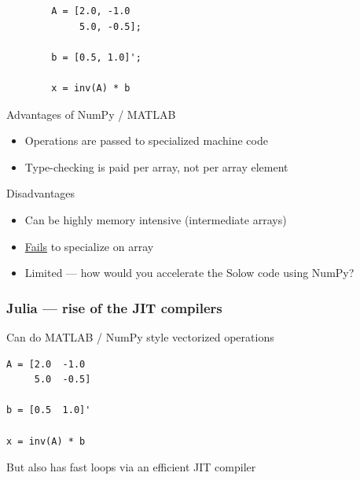 \begin{frame}[fragile]
    
    \begin{verbatim}
        A = [2.0, -1.0
             5.0, -0.5];

        b = [0.5, 1.0]';

        x = inv(A) * b
    \end{verbatim}
    
\end{frame}



    

\begin{frame}
    
    Advantages of NumPy / MATLAB

    \vspace{0.5em}
    \begin{itemize}
        \item Operations are passed to specialized machine code 
        \vspace{0.5em}
        \item Type-checking is paid per array, not per array element
    \end{itemize}

    \vspace{0.5em}
    \vspace{0.5em}
    Disadvantages 

    \begin{itemize}
        \item Can be highly memory intensive (intermediate arrays)
        \vspace{0.5em}
        \item \underline{Fails} to specialize on array 
        \vspace{0.5em}
        \item Limited --- how would you accelerate the Solow code using NumPy?
    \end{itemize}

\end{frame}







\begin{frame}[fragile]
    \frametitle{Julia --- rise of the JIT compilers}

    Can do MATLAB / NumPy style vectorized operations

    \begin{verbatim}
A = [2.0  -1.0
     5.0  -0.5]

b = [0.5  1.0]'

x = inv(A) * b
    \end{verbatim}
    

    \vspace{0.5em}
    \vspace{0.5em}
    But also has fast loops via an efficient JIT compiler

\end{frame}


